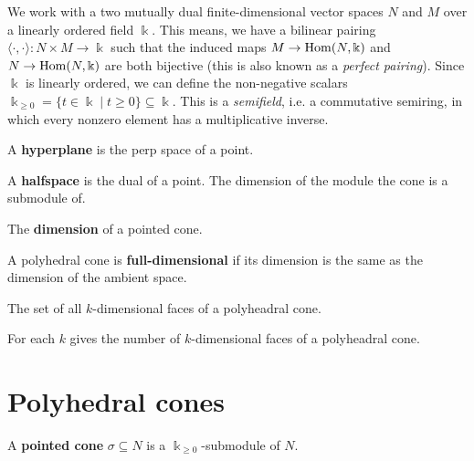 We work with a two mutually dual finite-dimensional vector spaces \( N
\) and \( M \) over a linearly ordered field \( \Bbbk \). This means,
we have a bilinear pairing \( \langle \cdot, \cdot \rangle \colon N
\times M \to \Bbbk \) such that the induced maps \( M \to
\operatorname{Hom}(N,\Bbbk) \) and \( N \to \operatorname{Hom}(N,\Bbbk) \) are both bijective
(this is also known as a \emph{perfect pairing}). Since \( \Bbbk \) is
linearly ordered, we can define the non-negative scalars \(\Bbbk_{\geq
0} = \{t \in \Bbbk \mid t \geq 0 \} \subseteq \Bbbk\). This is a
\emph{semifield}, i.e. a commutative semiring, in which every nonzero
element has a multiplicative inverse.




\begin{definition}
  \label{names}
  A {\bf hyperplane} is the perp space of a point.

  A {\bf halfspace} is the dual of a point.
  The dimension of the module the cone is a submodule of.

  The {\bf dimension} of a pointed cone.

  A polyhedral cone is {\bf full-dimensional} if its dimension is the same as the dimension of the ambient space.

  The set of all \(k\)-dimensional faces of a polyheadral cone.

  For each \(k\) gives the number of \(k\)-dimensional faces of a polyheadral cone.
\end{definition}


\section{Polyhedral cones}

\begin{definition}
  \label{pointed-cone}
  \uses{}
  \leanok
  A {\bf pointed cone} \( \sigma \subseteq N \) is a \( \Bbbk_{\geq 0}
  \)-submodule of \( N \).
\end{definition}

